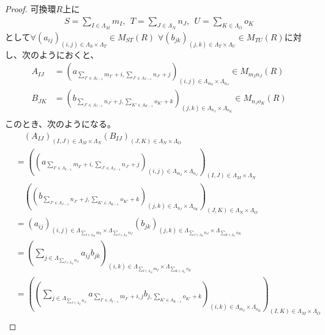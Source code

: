 \documentclass[dvipdfmx]{jsarticle}
\begin{document}
\begin{proof}
可換環$R$上に
\begin{align*}
S=\sum_{I \in \varLambda_{M}} m_{I} ,\ \ T=\sum_{J \in \varLambda_{N}} n_{J},\ \ U=\sum_{K \in \varLambda_{O}} o_{K}
\end{align*}
として$\forall \left( a_{ij} \right)_{(i,j) \in \varLambda_{S} \times \varLambda_{T}} \in M_{ST}(R)$ $\forall \left( b_{jk} \right)_{(j,k) \in \varLambda_{T} \times \varLambda_{U}} \in M_{TU}(R)$に対し、次のようにおくと、
\begin{align*}
A_{IJ} &=\left( a_{\sum_{I' \in \varLambda_{I - 1}} m_{I'} + i,\sum_{J' \in \varLambda_{J - 1}} n_{J'} + j} \right)_{(i,j) \in \varLambda_{m_{I}} \times \varLambda_{n_{J}}} \in M_{m_{I}n_{J}}(R) \\
B_{JK} &=\left( b_{\sum_{J' \in \varLambda_{J - 1}} n_{J'} + j,\sum_{K' \in \varLambda_{K - 1}} o_{K'} + k} \right)_{(j,k) \in \varLambda_{n_{J}} \times \varLambda_{o_{K}}} \in M_{n_{J}o_{K}}(R) \\
\end{align*}
このとき、次のようになる。
\begin{align*}
&\quad \left( A_{IJ} \right)_{(I,J) \in \varLambda_{M} \times \varLambda_{N}}\left( B_{IJ} \right)_{(J,K) \in \varLambda_{N} \times \varLambda_{O}} \\
&= \left( \left( a_{\sum_{I' \in \varLambda_{I - 1}} m_{I'} + i,\sum_{J' \in \varLambda_{J - 1}} n_{J'} + j} \right)_{(i,j) \in \varLambda_{m_{I}} \times \varLambda_{n_{J}}} \right)_{(I,J) \in \varLambda_{M} \times \varLambda_{N}} \\
&\quad \left( \left( b_{\sum_{J' \in \varLambda_{J - 1}} n_{J'} + j,\sum_{K' \in \varLambda_{K - 1}} o_{K'} + k} \right)_{(j,k) \in \varLambda_{n_{J}} \times \varLambda_{o_{K}}} \right)_{(J,K) \in \varLambda_{N} \times \varLambda_{O}}\\
&= \left( a_{ij} \right)_{(i,j) \in \varLambda_{\sum_{I \in \varLambda_{M}} m_{I}} \times \varLambda_{\sum_{J \in \varLambda_{N}} n_{J}}}\left( b_{jk} \right)_{(j,k) \in \varLambda_{\sum_{J \in \varLambda_{N}} n_{J}} \times \varLambda_{\sum_{K \in \varLambda_{O}} o_{K}}}\\
&= \left( \sum_{j \in \varLambda_{\sum_{J \in \varLambda_{N}} n_{J}}} {a_{ij}b_{jk}} \right)_{(i,k) \in \varLambda_{\sum_{I \in \varLambda_{M}} m_{I}} \times \varLambda_{\sum_{K \in \varLambda_{O}} o_{K}}}\\
&= \left( \left( \sum_{j \in \varLambda_{\sum_{J \in \varLambda_{N}} n_{J}}} {a_{\sum_{I' \in \varLambda_{I - 1}} m_{I'} + i,j}b_{j,\sum_{K' \in \varLambda_{K - 1}} o_{K'} + k}} \right)_{(i,k) \in \varLambda_{m_{I}} \times \varLambda_{o_{K}}} \right)_{(I,K) \in \varLambda_{M} \times \varLambda_{O}}\\

\end{align*}
\end{proof}
\end{document}
